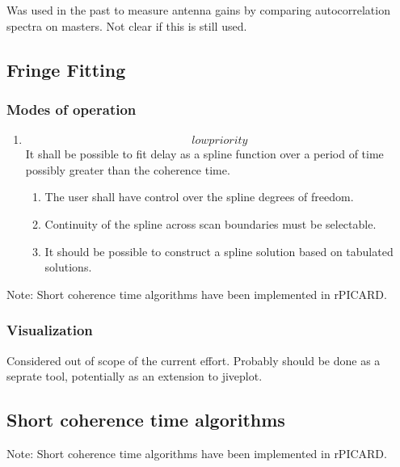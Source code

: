 \documentclass[11pt,a4paper]{article}
\begin{document}
Was used in the past to measure antenna gains by comparing
autocorrelation spectra on masters.  Not clear if this is still used.

\subsection{Fringe Fitting}

\subsubsection{Modes of operation}

\begin{enumerate}[subsubseclist]

\item \[low priority\] It shall be possible to fit delay as a spline
  function over a period of time possibly greater than the coherence
  time.

  \begin{enumerate}[subsubsecsublist]

  \item The user shall have control over the spline degrees of freedom.

  \item Continuity of the spline across scan boundaries must be selectable.

  \item It should be possible to construct a spline solution based on
    tabulated solutions.

  \end{enumerate}

\end{enumerate}

Note: Short coherence time algorithms have been implemented in rPICARD.

\subsubsection{Visualization}

Considered out of scope of the current effort.  Probably should be
done as a seprate tool, potentially as an extension to jiveplot.

\subsection{Short coherence time algorithms}

Note: Short coherence time algorithms have been implemented in rPICARD.
\end{document}
